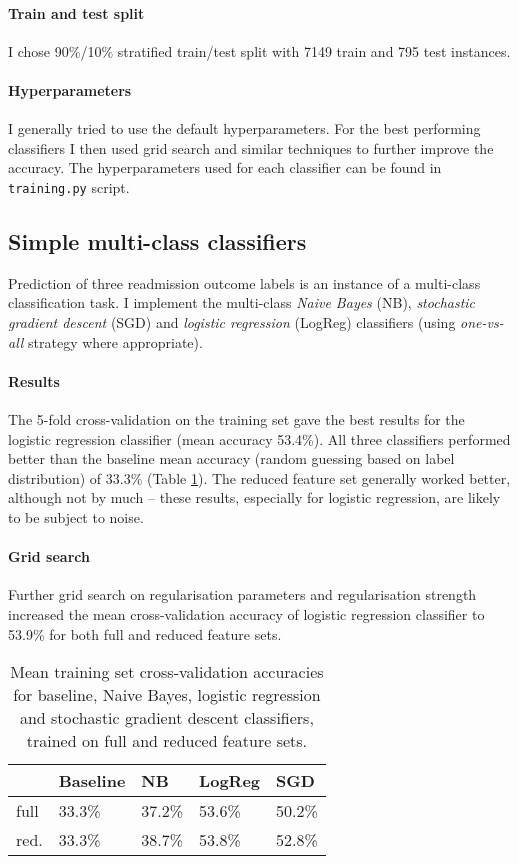 \documentclass[10pt, twocolumn]{article}
\begin{document}
\paragraph{Train and test split} I chose 90\%/10\% stratified train/test split with 7149 train and 795 test instances.

\paragraph{Hyperparameters} I generally tried to use the default hyperparameters. For the best performing classifiers I then used grid search and similar techniques to further improve the accuracy. The hyperparameters used for each classifier can be found in \texttt{training.py} script.

\subsection{Simple multi-class classifiers}
Prediction of three readmission outcome labels is an instance of a multi-class classification task. I implement the multi-class \textit{Naive Bayes} (NB), \textit{stochastic gradient descent} (SGD) and \textit{logistic regression}  (LogReg) classifiers (using \textit{one-vs-all} strategy where appropriate).

\paragraph{Results} The 5-fold cross-validation on the training set gave the best results for the logistic regression classifier (mean accuracy 53.4\%). All three classifiers performed better than the baseline mean accuracy (random guessing based on label distribution) of 33.3\% (Table \ref{multiclass}). The reduced feature set generally worked better, although not by much – these results, especially for logistic regression, are likely to be subject to noise.

\paragraph{Grid search} Further grid search on regularisation parameters and regularisation strength increased the mean cross-validation accuracy of logistic regression classifier to 53.9\% for both full and reduced feature sets.

\begin{table}[]
	\begin{tabularx}{\linewidth}{XXXXX}
		\hline
								 & \textbf{Baseline} & \textbf{NB} & \textbf{LogReg} & \textbf{SGD} \\ \hline
		full   & 33.3\%            & 37.2\%      & 53.6\%          & 50.2\%       \\
		red. & 33.3\%            & 38.7\%      & 53.8\%          & 52.8\%       \\ \hline
		\end{tabularx}
\caption{Mean training set cross-validation accuracies for baseline, Naive Bayes, logistic regression and stochastic gradient descent classifiers, trained on full and reduced feature sets.}\label{multiclass}
\end{table}
\end{document}
